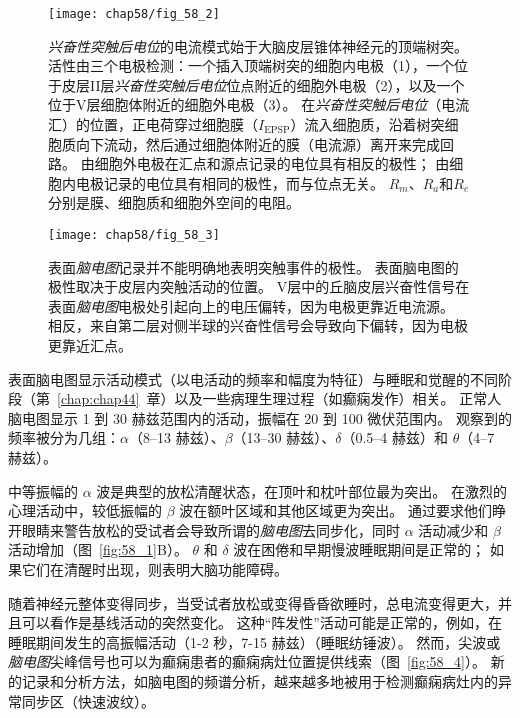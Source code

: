\begin{figure}[htbp]
	\centering
	\texttt{[image: chap58/fig\_58\_2]}
	\caption{\textit{兴奋性突触后电位}的电流模式始于大脑皮层锥体神经元的顶端树突。
		活性由三个电极检测：一个插入顶端树突的细胞内电极（1），一个位于皮层II层\textit{兴奋性突触后电位}位点附近的细胞外电极（2），以及一个位于V层细胞体附近的细胞外电极（3）。
		在\textit{兴奋性突触后电位}（电流汇）的位置，正电荷穿过细胞膜（$ I_{\text{EPSP}} $）流入细胞质，沿着树突细胞质向下流动，然后通过细胞体附近的膜（电流源）离开来完成回路。
		由细胞外电极在汇点和源点记录的电位具有相反的极性；
		由细胞内电极记录的电位具有相同的极性，而与位点无关。
		$ R_m $、$ R_a $和$ R_e $分别是膜、细胞质和细胞外空间的电阻。}
	\label{fig:58_2}
\end{figure}


\begin{figure}[htbp]
	\centering
	\texttt{[image: chap58/fig\_58\_3]}
	\caption{表面\textit{脑电图}记录并不能明确地表明突触事件的极性。
		表面脑电图的极性取决于皮层内突触活动的位置。
		V层中的丘脑皮层兴奋性信号在表面\textit{脑电图}电极处引起向上的电压偏转，因为电极更靠近电流源。
		相反，来自第二层对侧半球的兴奋性信号会导致向下偏转，因为电极更靠近汇点。}
	\label{fig:58_3}
\end{figure}


表面脑电图显示活动模式（以电活动的频率和幅度为特征）与睡眠和觉醒的不同阶段（第~\ref{chap:chap44}~章）以及一些病理生理过程（如癫痫发作）相关。
正常人脑电图显示 1 到 30 赫兹范围内的活动，振幅在 20 到 100 微伏范围内。
观察到的频率被分为几组：$\alpha$（8–13 赫兹）、$ \beta $（13–30 赫兹）、$ \delta $（0.5–4 赫兹）和 $ \theta $（4–7 赫兹）。


中等振幅的 $ \alpha $ 波是典型的放松清醒状态，在顶叶和枕叶部位最为突出。
在激烈的心理活动中，较低振幅的 $ \beta $ 波在额叶区域和其他区域更为突出。
通过要求他们睁开眼睛来警告放松的受试者会导致所谓的\textit{脑电图}去同步化，同时 $\alpha$ 活动减少和 $ \beta $ 活动增加（图~\ref{fig:58_1}B）。
$ \theta $ 和 $ \delta $ 波在困倦和早期慢波睡眠期间是正常的；
如果它们在清醒时出现，则表明大脑功能障碍。


随着神经元整体变得同步，当受试者放松或变得昏昏欲睡时，总电流变得更大，并且可以看作是基线活动的突然变化。
这种“阵发性”活动可能是正常的，例如，在睡眠期间发生的高振幅活动（1-2 秒，7-15 赫兹）（睡眠纺锤波）。
然而，尖波或\textit{脑电图}尖峰信号也可以为癫痫患者的癫痫病灶位置提供线索（图~\ref{fig:58_4}）。
新的记录和分析方法，如脑电图的频谱分析，越来越多地被用于检测癫痫病灶内的异常同步区（快速波纹）。


